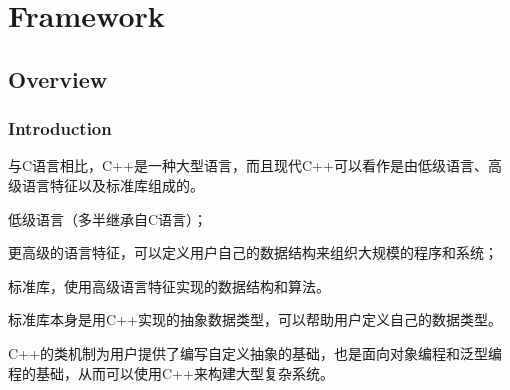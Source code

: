 \part{Framework}


\chapter{Overview}


\section{Introduction}


与C语言相比，C++是一种大型语言，而且现代C++可以看作是由低级语言、高级语言特征以及标准库组成的。

\begin{compactitem}
\item 低级语言（多半继承自C语言）；
\item 更高级的语言特征，可以定义用户自己的数据结构来组织大规模的程序和系统；
\item 标准库，使用高级语言特征实现的数据结构和算法。
\end{compactitem}

标准库本身是用C++实现的抽象数据类型，可以帮助用户定义自己的数据类型。


C++的类机制为用户提供了编写自定义抽象的基础，也是面向对象编程和泛型编程的基础，从而可以使用C++来构建大型复杂系统。















































